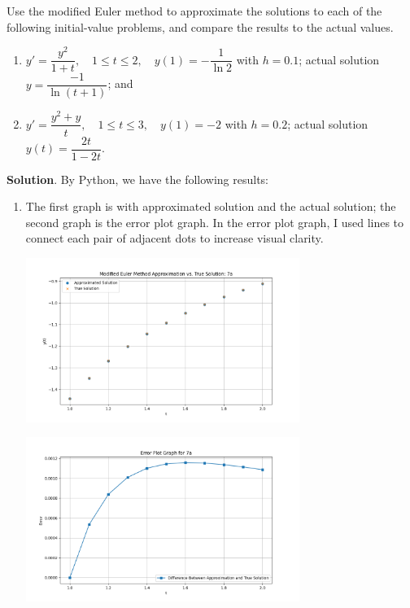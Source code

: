\documentclass[11pt]{article}
\theoremstyle{break}
\numberwithin{equation}{theorem}
\begin{document}
\newpage
\begin{problem}\label{problem 7} %
    Use the modified Euler method to approximate the solutions to each of the following initial-value problems, and compare the results to the actual values.\begin{enumerate}
        \item $y'=\dfrac{y^2}{1+t}, \quad 1\leq t\leq 2, \quad y(1)=-\dfrac{1}{\ln 2}$ with $h=0.1$; actual solution $y=\dfrac{-1}{\ln(t+1)}$; and
        \item $y'=\dfrac{y^2+y}{t}, \quad 1\leq t\leq 3, \quad y(1)=-2$ with $h=0.2$; actual solution $y(t)=\dfrac{2t}{1-2t}$.
    \end{enumerate}
\end{problem}
\textbf{Solution}. By Python, we have the following results:
\begin{enumerate}
    \item The first graph is with approximated solution and the actual solution; the second graph is the error plot graph. In the error plot graph, I used lines to connect each pair of adjacent dots to increase visual clarity. \begin{center}
        \includegraphics[width=0.7\textwidth]{P7a.png}
    \end{center}
    \begin{center}
        \includegraphics[width=0.7\textwidth]{P7ae.png}
    \end{center}

\end{enumerate}
\end{document}
